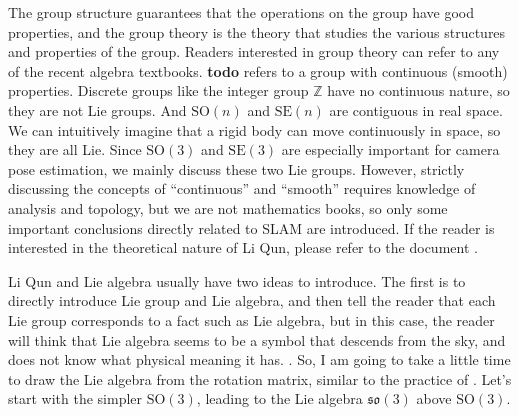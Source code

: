 The group structure guarantees that the operations on the group have good properties, and the group theory is the theory that studies the various structures and properties of the group. Readers interested in group theory can refer to any of the recent algebra textbooks. \textbf{todo} refers to a group with continuous (smooth) properties. Discrete groups like the integer group $\mathbb{Z}$ have no continuous nature, so they are not Lie groups. And $\mathrm{SO}(n)$ and $\mathrm{SE}(n)$ are contiguous in real space. We can intuitively imagine that a rigid body can move continuously in space, so they are all Lie. Since $\mathrm{SO}(3)$ and $\mathrm{SE}(3)$ are especially important for camera pose estimation, we mainly discuss these two Lie groups. However, strictly discussing the concepts of “continuous” and “smooth” requires knowledge of analysis and topology, but we are not mathematics books, so only some important conclusions directly related to SLAM are introduced. If the reader is interested in the theoretical nature of Li Qun, please refer to the document \cite{Varadarajan2013}.

Li Qun and Lie algebra usually have two ideas to introduce. The first is to directly introduce Lie group and Lie algebra, and then tell the reader that each Lie group corresponds to a fact such as Lie algebra, but in this case, the reader will think that Lie algebra seems to be a symbol that descends from the sky, and does not know what physical meaning it has. . So, I am going to take a little time to draw the Lie algebra from the rotation matrix, similar to the practice of \cite{Ma2012}. Let's start with the simpler $\mathrm{SO}(3)$, leading to the Lie algebra $\mathfrak{so}(3)$ above $\mathrm{SO}(3)$.

